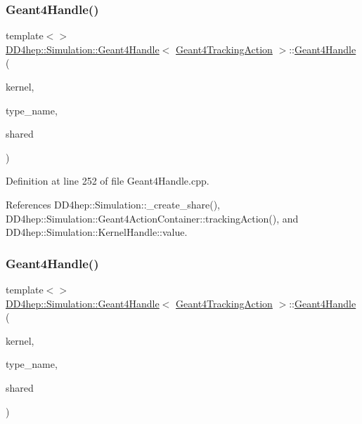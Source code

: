 \subsubsection{\texorpdfstring{Geant4\+Handle()}{Geant4Handle()}\hspace{0.1cm}{\footnotesize\ttfamily [14/20]}}
{\footnotesize\ttfamily template$<$$>$ \\
\hyperlink{class_d_d4hep_1_1_simulation_1_1_geant4_handle}{D\+D4hep\+::\+Simulation\+::\+Geant4\+Handle}$<$ \hyperlink{class_d_d4hep_1_1_simulation_1_1_geant4_tracking_action}{Geant4\+Tracking\+Action} $>$\+::\hyperlink{class_d_d4hep_1_1_simulation_1_1_geant4_handle}{Geant4\+Handle} (\begin{DoxyParamCaption}\item[{\hyperlink{class_d_d4hep_1_1_simulation_1_1_geant4_kernel}{Geant4\+Kernel} \&}]{kernel,  }\item[{const string \&}]{type\+\_\+name,  }\item[{bool}]{shared }\end{DoxyParamCaption})}



Definition at line 252 of file Geant4\+Handle.\+cpp.



References D\+D4hep\+::\+Simulation\+::\+\_\+create\+\_\+share(), D\+D4hep\+::\+Simulation\+::\+Geant4\+Action\+Container\+::tracking\+Action(), and D\+D4hep\+::\+Simulation\+::\+Kernel\+Handle\+::value.

\hypertarget{class_d_d4hep_1_1_simulation_1_1_geant4_handle_a089c38776dd6c86047bb581db7a0b145}{}\label{class_d_d4hep_1_1_simulation_1_1_geant4_handle_a089c38776dd6c86047bb581db7a0b145} 
\subsubsection{\texorpdfstring{Geant4\+Handle()}{Geant4Handle()}\hspace{0.1cm}{\footnotesize\ttfamily [15/20]}}
{\footnotesize\ttfamily template$<$$>$ \\
\hyperlink{class_d_d4hep_1_1_simulation_1_1_geant4_handle}{D\+D4hep\+::\+Simulation\+::\+Geant4\+Handle}$<$ \hyperlink{class_d_d4hep_1_1_simulation_1_1_geant4_tracking_action}{Geant4\+Tracking\+Action} $>$\+::\hyperlink{class_d_d4hep_1_1_simulation_1_1_geant4_handle}{Geant4\+Handle} (\begin{DoxyParamCaption}\item[{\hyperlink{class_d_d4hep_1_1_simulation_1_1_geant4_kernel}{Geant4\+Kernel} \&}]{kernel,  }\item[{const char $\ast$}]{type\+\_\+name,  }\item[{bool}]{shared }\end{DoxyParamCaption})}



